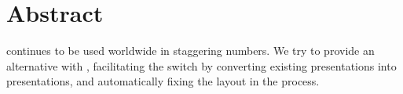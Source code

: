 
 \chapter*{Abstract}

  \ppt* continues to be used worldwide in staggering numbers. We try to provide
  an alternative with \mxp, facilitating the switch by converting existing \ppt
  presentations into \mxp presentations, and automatically fixing the layout in
  the process.


